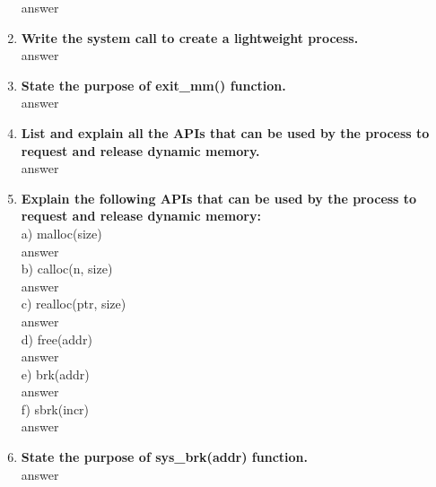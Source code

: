 \documentclass[a4paper,12pt]{article}
\begin{document}
\begin{flushleft}
\begin{enumerate}
{\color{red}answer}\\
\item \textbf{ Write the system call to create a lightweight process.}\\
{\color{red}answer}\\
\item \textbf{ State the purpose of exit\_mm() function.}\\
{\color{red}answer}\\
\item \textbf{ List and explain all the APIs that can be used by the process to request and release dynamic memory.}\\
{\color{red}answer}\\
\item \textbf{ Explain the following APIs that can be used by the process to request and release dynamic memory:}\\
a) malloc(size) \\
{\color{red}answer}\\
b) calloc(n, size) \\
{\color{red}answer}\\
c) realloc(ptr, size)\\
{\color{red}answer}\\
d) free(addr) \\
{\color{red}answer}\\
e) brk(addr) \\
{\color{red}answer}\\
f) sbrk(incr)\\
{\color{red}answer}\\
\item \textbf{ State the purpose of sys\_brk(addr) function.}\\
{\color{red}answer}\\
\end{enumerate}


\end{flushleft}
\end{document}

